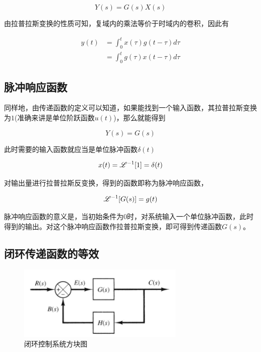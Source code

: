 \begin{equation*}
Y(s)=G(s)X(s)
\end{equation*}

由拉普拉斯变换的性质可知，复域内的乘法等价于时域内的卷积，因此有

\begin{align*}
y(t)&=\int_0^tx(\tau)g(t-\tau)d\tau\\
&=\int_0^tg(\tau)x(t-\tau)d\tau
\end{align*}

\subsection{脉冲响应函数}

同样地，由传递函数的定义可以知道，如果能找到一个输入函数，其拉普拉斯变换为$1$(准确来讲是单位阶跃函数$u(t)$)，那么就能得到

\begin{equation*}
Y(s)=G(s)
\end{equation*}

此时需要的输入函数就应当是单位脉冲函数$\delta(t)$

\begin{equation*}
x(t)=\mathscr{L}^{-1}[1]=\delta(t)
\end{equation*}

对输出量进行拉普拉斯反变换，得到的函数即称为脉冲响应函数，


\begin{equation*}
\mathscr{L}^{-1}[G(s)]=g(t)
\end{equation*}

脉冲响应函数的意义是，当初始条件为$0$时，对系统输入一个单位脉冲函数，此时得到的输出。对这个脉冲响应函数作拉普拉斯变换，即可得到传递函数$G(s)$。

\subsection{闭环传递函数的等效}


\begin{figure}[!ht]
	\centering
	\includegraphics[width=8cm]{figures/2.png}
	\caption{闭环控制系统方块图}
	\label{2}
\end{figure}



